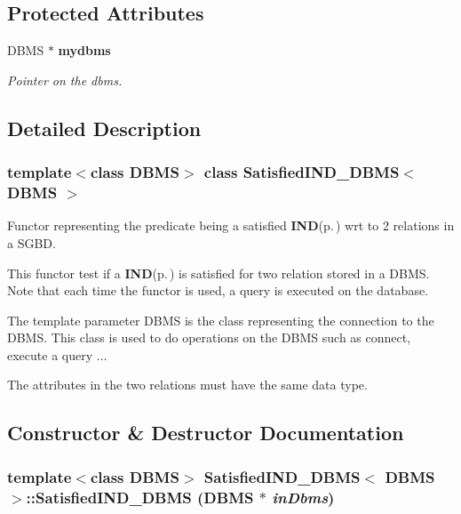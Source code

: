 \subsection*{Protected Attributes}
\begin{CompactItemize}
\item 
DBMS $\ast$ {\bf mydbms}\label{class_satisfied_i_n_d___d_b_m_s_6a69c4a2896c294ee5bb98959f1775bc}

\begin{CompactList}\small\item\em Pointer on the dbms. \item\end{CompactList}\end{CompactItemize}


\subsection{Detailed Description}
\subsubsection*{template$<$class DBMS$>$ class Satisfied\-IND\_\-DBMS$<$ DBMS $>$}

Functor representing the predicate being a satisfied {\bf IND}{\rm (p.\,\pageref{class_i_n_d})} wrt to 2 relations in a SGBD. 

This functor test if a {\bf IND}{\rm (p.\,\pageref{class_i_n_d})} is satisfied for two relation stored in a DBMS. Note that each time the functor is used, a query is executed on the database.

The template parameter DBMS is the class representing the connection to the DBMS. This class is used to do operations on the DBMS such as connect, execute a query ...

The attributes in the two relations must have the same data type. 



\subsection{Constructor \& Destructor Documentation}
\subsubsection{\setlength{\rightskip}{0pt plus 5cm}template$<$class DBMS$>$ {\bf Satisfied\-IND\_\-DBMS}$<$ DBMS $>$::{\bf Satisfied\-IND\_\-DBMS} (DBMS $\ast$ {\em in\-Dbms})\hspace{0.3cm}{\tt  [inline]}}\label{class_satisfied_i_n_d___d_b_m_s_90330aefbc693768d516a523f4f04625}


